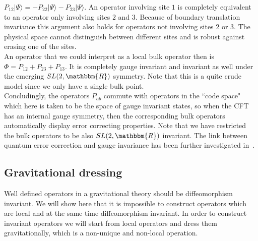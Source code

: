 \documentclass{PoS}
\newcommand{\ket}[1]{|#1\rangle}
\begin{document}
$P_{12}\ket{\Psi} = -P_{22}\ket{\Psi} - P_{23}\ket{\Psi}$. An operator involving site $1$ is completely equivalent to an operator only involving sites $2$ and $3$. Because of boundary translation invariance this argument also holds for operators not involving sites $2$ or $3$.  The physical space cannot distinguish between different sites and is robust against erasing one of the sites.\\

An operator that we could interpret as a local bulk operator then is $\Phi = P_{12}+P_{23}+P_{13}$. It is completely gauge invariant and invariant as well under the emerging $SL(2,\mathbbm{R})$ symmetry. Note that this is a quite crude model since we only have a single bulk point.\\

Concludingly, the operators $P_{ab}$ commute with operators in the ``code space" which here is taken to be the space of gauge invariant states, so when the CFT has an internal gauge symmetry, then the corresponding bulk operators automatically display error correcting properties. Note that we have restricted the bulk operators to be also $SL(2,\mathbbm{R})$ invariant. The link between quantum error correction and gauge invariance has been further investigated in~\cite{deBoer:2016yiz,Freivogel:2016zsb}.\\



\subsection{Gravitational dressing}
Well defined operators in a gravitational theory should be diffeomorphism invariant. We will show here that it is impossible to construct operators which are local and at the same time diffeomorphism invariant. In order to construct invariant operators we will start from local operators and dress them gravitationally, which is a non-unique and non-local operation.\\
\end{document}
